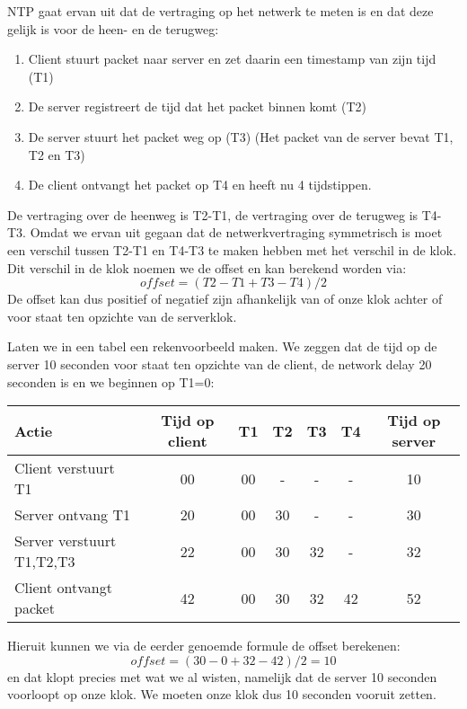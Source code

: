 NTP gaat ervan uit dat de vertraging op het netwerk te meten is en dat deze gelijk is voor de heen- en de terugweg:
\begin{enumerate}
\item Client stuurt packet naar server en zet daarin een timestamp van zijn tijd (T1)
\item De server registreert de tijd dat het packet binnen komt (T2)
\item De server stuurt het packet weg op (T3) (Het packet van de server bevat T1, T2 en T3)
\item De client ontvangt het packet op T4 en heeft nu 4 tijdstippen.
\end{enumerate}
De vertraging over de heenweg is T2-T1, de vertraging over de terugweg is T4-T3. Omdat we ervan uit gegaan dat de netwerkvertraging symmetrisch is moet een verschil tussen T2-T1 en T4-T3 te maken hebben met het verschil in de klok. Dit verschil in de klok noemen we de offset en kan berekend worden via:
\[ offset = (T2 - T1 + T3 - T4)/2 \]
De offset kan dus positief of negatief zijn afhankelijk van of onze klok achter of voor staat ten opzichte van de serverklok.

Laten we in een tabel een rekenvoorbeeld maken. We zeggen dat de tijd op de server 10 seconden voor staat ten opzichte van de client, de network delay 20 seconden is en we beginnen op T1=0:
\begin{center}
\begin{tabular}{ |l|c|c|c|c|c|c| }
\hline
Actie & Tijd op client & T1 & T2 & T3 & T4 & Tijd op server \\
\hline
Client verstuurt T1 & 00 & 00 & - & - & - & 10 \\
\hline
Server ontvang T1 & 20 & 00 & 30 & - & - & 30 \\
\hline
Server verstuurt T1,T2,T3 & 22 & 00 & 30 & 32 & - & 32 \\
\hline
Client ontvangt packet & 42 & 00 & 30 & 32 & 42 & 52 \\
\hline
\end{tabular}
\end{center}
Hieruit kunnen we via de eerder genoemde formule de offset berekenen:
\[ offset = (30 - 0 + 32 - 42)/2 = 10 \]
en dat klopt precies met wat we al wisten, namelijk dat de server 10 seconden voorloopt op onze klok. We moeten onze klok dus 10 seconden vooruit zetten.


